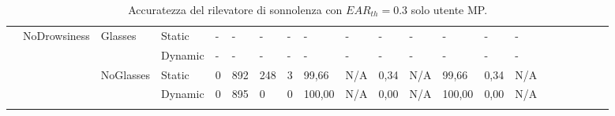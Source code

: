 \documentclass[12pt]{article}
\begin{document}
\begin{landscape}
\begin{table}[]
\begin{adjustbox}{width=1.4\textwidth}
\begin{tabular}{lllllllllllllllccllll}
				\multicolumn{1}{|l|}{} & \multicolumn{1}{l|}{\multirow{4}{*}{NoDrowsiness}} & \multicolumn{1}{l|}{\multirow{2}{*}{Glasses}} & \multicolumn{1}{l|}{Static} & \multicolumn{1}{l|}{-} & \multicolumn{1}{l|}{-} & \multicolumn{1}{l|}{-} & \multicolumn{1}{l|}{-} & \multicolumn{1}{l|}{-} & \multicolumn{1}{l|}{-} & \multicolumn{1}{l|}{-} & \multicolumn{1}{l|}{-} & \multicolumn{1}{l|}{-} & \multicolumn{1}{l|}{-} & \multicolumn{1}{l|}{-} & \multicolumn{1}{c|}{} & \multicolumn{1}{c|}{} & \multicolumn{1}{l|}{} & \multicolumn{1}{l|}{} & \multicolumn{1}{l|}{} & \multicolumn{1}{l|}{} \\ \cline{4-15}
				\multicolumn{1}{|l|}{} & \multicolumn{1}{l|}{} & \multicolumn{1}{l|}{} & \multicolumn{1}{l|}{Dynamic} & \multicolumn{1}{l|}{-} & \multicolumn{1}{l|}{-} & \multicolumn{1}{l|}{-} & \multicolumn{1}{l|}{-} & \multicolumn{1}{l|}{-} & \multicolumn{1}{l|}{-} & \multicolumn{1}{l|}{-} & \multicolumn{1}{l|}{-} & \multicolumn{1}{l|}{-} & \multicolumn{1}{l|}{-} & \multicolumn{1}{l|}{-} & \multicolumn{1}{c|}{} & \multicolumn{1}{c|}{} & \multicolumn{1}{l|}{} & \multicolumn{1}{l|}{} & \multicolumn{1}{l|}{} & \multicolumn{1}{l|}{} \\ \cline{3-15}
				\multicolumn{1}{|l|}{} & \multicolumn{1}{l|}{} & \multicolumn{1}{l|}{\multirow{2}{*}{NoGlasses}} & \multicolumn{1}{l|}{Static}  & \multicolumn{1}{l|}{0} & \multicolumn{1}{l|}{892} & \multicolumn{1}{l|}{248} & \multicolumn{1}{l|}{3} & \multicolumn{1}{l|}{99,66} & \multicolumn{1}{l|}{N/A} & \multicolumn{1}{l|}{0,34} & \multicolumn{1}{l|}{N/A} & \multicolumn{1}{l|}{99,66} & \multicolumn{1}{l|}{0,34} & \multicolumn{1}{l|}{N/A} & \multicolumn{1}{c|}{} & \multicolumn{1}{c|}{} & \multicolumn{1}{l|}{} & \multicolumn{1}{l|}{} & \multicolumn{1}{l|}{} & \multicolumn{1}{l|}{} \\ \cline{4-15}
				\multicolumn{1}{|l|}{} & \multicolumn{1}{l|}{} & \multicolumn{1}{l|}{} & \multicolumn{1}{l|}{Dynamic} & \multicolumn{1}{l|}{0} & \multicolumn{1}{l|}{895} & \multicolumn{1}{l|}{0} & \multicolumn{1}{l|}{0} & \multicolumn{1}{l|}{100,00} & \multicolumn{1}{l|}{N/A} & \multicolumn{1}{l|}{0,00} & \multicolumn{1}{l|}{N/A} & \multicolumn{1}{l|}{100,00} & \multicolumn{1}{l|}{0,00} & \multicolumn{1}{l|}{N/A} & \multicolumn{1}{c|}{} & \multicolumn{1}{c|}{} & \multicolumn{1}{l|}{} & \multicolumn{1}{l|}{} & \multicolumn{1}{l|}{} & \multicolumn{1}{l|}{} \\ \hline
				& & & & & & & & & & & & & & & \multicolumn{1}{l}{} & \multicolumn{1}{l}{} & & & &
			\end{tabular}
		\end{adjustbox}
		\caption{Accuratezza del rilevatore di sonnolenza con $EAR_{th}=0.3$ solo utente MP.}
		\label{table:mp_ear_30}
	\end{table}
\end{landscape}
\end{document}
